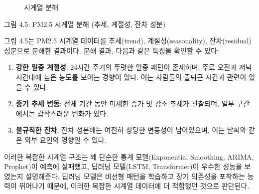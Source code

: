 \documentclass[12pt,ko,a4,]{report}
\begin{document}
\begin{figure}
\centering
{}
\caption{시계열 분해}
\end{figure}

그림 4.5: PM2.5 시계열 분해 (추세, 계절성, 잔차 성분)

그림 4.5는 PM2.5 시계열 데이터를 추세(trend), 계절성(seasonality),
잔차(residual) 성분으로 분해한 결과이다. 분해 결과, 다음과 같은 특징을
확인할 수 있다:

\begin{enumerate}
\def\labelenumi{\arabic{enumi}.}
\item
  \textbf{강한 일중 계절성}: 24시간 주기의 뚜렷한 일중 패턴이 존재하며,
  주로 오전과 저녁 시간대에 높은 농도를 보이는 경향이 있다. 이는
  사람들의 출퇴근 시간과 관련이 있을 수 있다.
\item
  \textbf{중기 추세 변동}: 전체 기간 동안 미세한 증가 및 감소 추세가
  관찰되며, 일부 구간에서는 갑작스러운 변화가 있다.
\item
  \textbf{불규칙한 잔차}: 잔차 성분에는 여전히 상당한 변동성이
  남아있으며, 이는 날씨와 같은 외부 요인의 영향일 수 있다.
\end{enumerate}

이러한 복잡한 시계열 구조는 왜 단순한 통계 모델(Exponential Smoothing,
ARIMA, Prophet)이 예측에 실패했고, 딥러닝 모델(LSTM, Transformer)이
우수한 성능을 보였는지 설명해준다. 딥러닝 모델은 비선형 패턴을 학습하고
장기 의존성을 포착하는 능력이 뛰어나기 때문에, 이러한 복잡한 시계열
데이터에 더 적합했던 것으로 판단된다.
\end{document}
